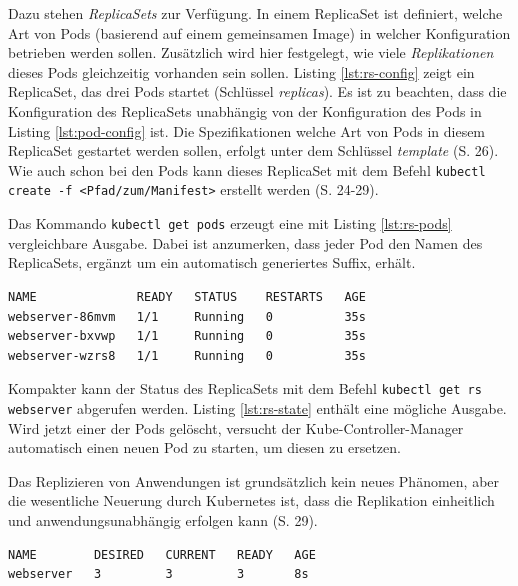 \documentclass[11pt,a4paper]{article}
\begin{document}
Dazu stehen \emph{ReplicaSets} zur Verfügung.
In einem ReplicaSet ist definiert, welche Art von Pods (basierend auf einem gemeinsamen Image)
in welcher Konfiguration betrieben werden sollen. Zusätzlich wird hier festgelegt, wie viele \emph{Replikationen}
dieses Pods gleichzeitig vorhanden sein sollen.
Listing \ref{lst:rs-config} zeigt ein ReplicaSet, das drei Pods startet (Schlüssel \emph{replicas}).
Es ist zu beachten, dass die Konfiguration des ReplicaSets unabhängig von der Konfiguration
des Pods in Listing \ref{lst:pod-config} ist.
Die Spezifikationen welche Art von Pods in diesem ReplicaSet gestartet werden sollen,
erfolgt unter dem Schlüssel \emph{template} \cite{Schmeling_Dargatz_2022} (S. 26).
Wie auch schon bei den Pods kann dieses ReplicaSet mit dem Befehl
\lstinline|kubectl create -f <Pfad/zum/Manifest>| erstellt werden \cite{Schmeling_Dargatz_2022} (S. 24-29).



Das Kommando \lstinline|kubectl get pods| erzeugt eine mit Listing \ref{lst:rs-pods}
vergleichbare Ausgabe. Dabei ist anzumerken, dass jeder Pod den Namen des ReplicaSets,
ergänzt um ein automatisch generiertes Suffix, erhält.

\begin{lstlisting}[caption={Drei Pods wurden erfolgreich gestartet \cite{Schmeling_Dargatz_2022} (S. 27).}, label={lst:rs-pods}]
NAME              READY   STATUS    RESTARTS   AGE
webserver-86mvm   1/1     Running   0          35s
webserver-bxvwp   1/1     Running   0          35s
webserver-wzrs8   1/1     Running   0          35s
\end{lstlisting}

Kompakter kann der Status des ReplicaSets mit dem Befehl \lstinline|kubectl get rs webserver|
abgerufen werden. Listing \ref{lst:rs-state} enthält eine mögliche Ausgabe.
Wird jetzt einer der Pods gelöscht, versucht der Kube-Controller-Manager automatisch
einen neuen Pod zu starten, um diesen zu ersetzen.

Das Replizieren von Anwendungen ist grundsätzlich kein neues Phänomen, aber
die wesentliche Neuerung durch Kubernetes ist, dass die Replikation einheitlich
und anwendungsunabhängig erfolgen kann \cite{Schmeling_Dargatz_2022} (S. 29).

\begin{lstlisting}[caption={Ein ReplicaSet mit drei erfolgreich gestarteten Instanzen \cite{Schmeling_Dargatz_2022} (S. 27).}, label={lst:rs-state}]
NAME        DESIRED   CURRENT   READY   AGE
webserver   3         3         3       8s
\end{lstlisting}
\end{document}
